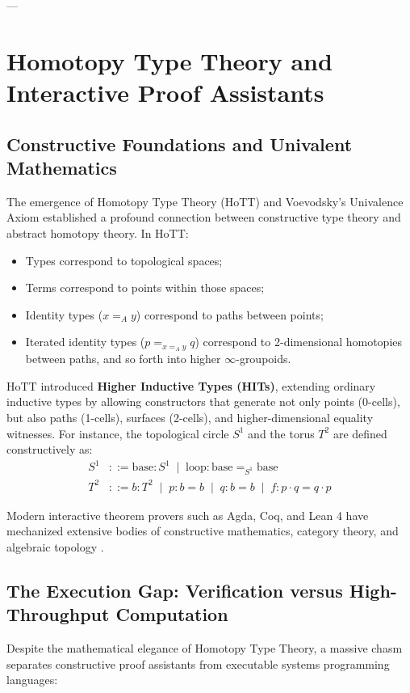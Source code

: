 ---

\section{Homotopy Type Theory and Interactive Proof Assistants}
\label{sec:hott_proof_assistants}

\subsection{Constructive Foundations and Univalent Mathematics}
The emergence of Homotopy Type Theory (HoTT) \cite{hottbook2013} and Voevodsky's Univalence Axiom \cite{voevodsky2014univalent} established a profound connection between constructive type theory and abstract homotopy theory. In HoTT:
\begin{itemize}[leftmargin=1.5cm]
    \item Types correspond to topological spaces;
    \item Terms correspond to points within those spaces;
    \item Identity types ($x =_A y$) correspond to paths between points;
    \item Iterated identity types ($p =_{x =_A y} q$) correspond to 2-dimensional homotopies between paths, and so forth into higher $\infty$-groupoids.
\end{itemize}

HoTT introduced \textbf{Higher Inductive Types (HITs)}, extending ordinary inductive types by allowing constructors that generate not only points (0-cells), but also paths (1-cells), surfaces (2-cells), and higher-dimensional equality witnesses. For instance, the topological circle $S^1$ and the torus $T^2$ are defined constructively as:
\begin{align}
    S^1 &::= \text{base} : S^1 \;\mid\; \text{loop} : \text{base} =_{S^1} \text{base} \\
    T^2 &::= b : T^2 \;\mid\; p : b = b \;\mid\; q : b = b \;\mid\; f : p \cdot q = q \cdot p
\end{align}

Modern interactive theorem provers such as Agda, Coq, and Lean 4 have mechanized extensive bodies of constructive mathematics, category theory, and algebraic topology \cite{wieser2022formalizing}.

\subsection{The Execution Gap: Verification versus High-Throughput Computation}
Despite the mathematical elegance of Homotopy Type Theory, a massive chasm separates constructive proof assistants from executable systems programming languages:

